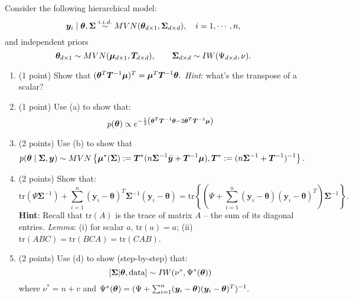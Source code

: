 \documentclass{article}
\newcommand{\bSigma}{\boldsymbol{\Sigma}}
\begin{document}
\begin{enumerate}
Consider the following hierarchical model:
\[ \bm{y}_i \mid \btheta,\bSigma \stackrel{i.i.d.}{\sim} MVN(\btheta_{d \times 1},\bSigma_{d \times d}), \quad i = 1, \cdots, n, \]
and independent priors $$\btheta_{d \times 1} \sim MVN(\bmu_{d \times 1},\bm{T}_{d \times d}), 
\qquad \bSigma_{d \times d} \sim IW(\Psi_{d \times d},\nu).$$
\begin{enumerate}
\item (1 point) Show that $({\bm\theta}^T \bm{T}^{-1} \bm{\mu})^T = \bm{\mu}^T \bm{T}^{-1} {\bm\theta}.$
\textit{Hint}: what's the transpose of a scalar?
\item (1 point) Use (a) to show that:
\[ p({\bm\theta}) \propto e^{-\frac{1}{2}\left({\bm\theta}^T\bm{T}^{-1}{\bm\theta} - 2{\bm\theta}^T \bm{T}^{-1} \bm{\mu} \right)} \]
\item (2 points) Use (b) to show that
$$ p(\btheta \mid \bSigma, \bm{y} )
\sim MVN\left\{\bmu^*(\bSigma) := {\bm{T}^*}(n \boldsymbol{\Sigma}^{-1}\bar{\bm{y}} + \bm{T}^{-1}\bmu), \bm{T}^* := ( n\boldsymbol{\Sigma}^{-1} + \bm{T}^{-1})^{-1}\right\}. $$
\item (2 points) Show that:
\[ \text{tr}(\Psi\boldsymbol{\Sigma}^{-1})+\sum_{i=1}^n (\bm{y}_i-\boldsymbol{\theta})^T \boldsymbol{\Sigma}^{-1}(\bm{y}_i-\boldsymbol{\theta}) = \text{tr}\left\{\left(\Psi + \sum_{i=1}^n (\bm{y}_i-\boldsymbol{\theta}) (\bm{y}_i-\boldsymbol{\theta})^T \right) \boldsymbol{\Sigma}^{-1}\right\}.\]
\textbf{Hint}: Recall that $\text{tr}(A)$ is the trace of matrix $A$ -- the sum of its diagonal entries. \textit{Lemma}: (i) for scalar $a$, $\text{tr}(a)=a$; (ii) $\text{tr}(ABC) = \text{tr}(BCA) = \text{tr}(CAB)$.
\item (2 points) Use (d) to show (step-by-step) that:
\[ [\bSigma|\btheta,\text{data}] \sim IW(\nu^*, \Psi^*(\btheta))\]
where $\nu^* = n + v$ and $\Psi^*({\bm\theta}) = (\Psi + \sum_{i=1}^n (\bm{y}_i-\boldsymbol{\theta}) (\bm{y}_i-\boldsymbol{\theta})^T)^{-1} .$
\end{enumerate}
\end{enumerate}
\end{document}
